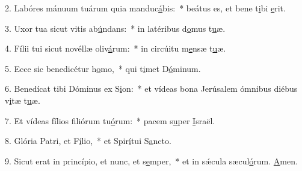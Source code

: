 2. Labóres mánuum tuárum quia manduc\uline{á}bis:~* beátus es, et bene t\uline{i}bi \uline{e}rit.\par 
3. Uxor tua sicut vitis ab\uline{ú}ndans:~* in latéribus d\uline{o}mus t\uline{u}æ.\par 
4. Fílii tui sicut novéllæ oliv\uline{á}rum:~* in circúitu m\uline{e}nsæ t\uline{u}æ.\par 
5. Ecce sic benedicétur h\uline{o}mo,~* qui t\uline{i}met D\uline{ó}minum.\par 
6. Benedícat tibi Dóminus ex S\uline{i}on:~* et vídeas bona Jerúsalem ómnibus diébus v\uline{i}tæ t\uline{u}æ.\par 
7. Et vídeas fílios filiórum tu\uline{ó}rum:~* pacem s\uline{u}per \uline{I}sraël.\par 
8. Glória Patri, et F\uline{í}lio,~* et Spir\uline{í}tui S\uline{a}ncto.\par 
9. Sicut erat in princípio, et nunc, et s\uline{e}mper,~* et in sǽcula sæcul\uline{ó}rum. \uline{A}men.\par 
